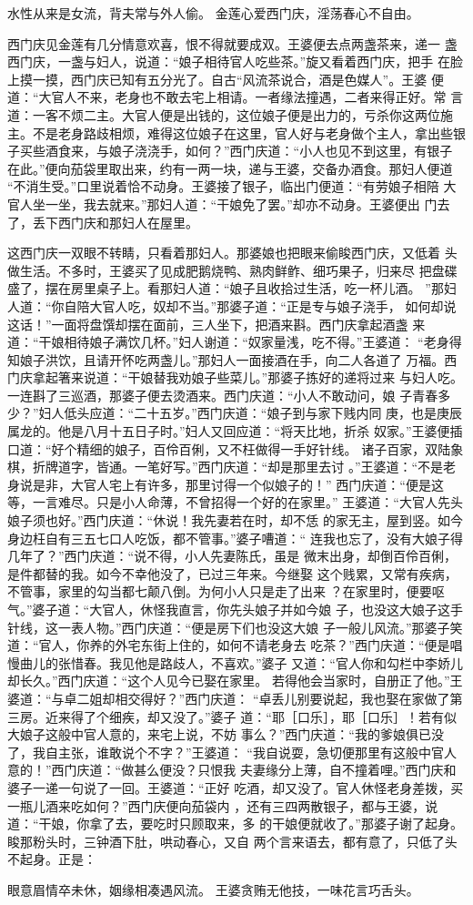 水性从来是女流，背夫常与外人偷。
金莲心爱西门庆，淫荡春心不自由。

西门庆见金莲有几分情意欢喜，恨不得就要成双。王婆便去点两盏茶来，递一
盏西门庆，一盏与妇人，说道：“娘子相待官人吃些茶。”旋又看着西门庆，把手
在脸上摸一摸，西门庆已知有五分光了。自古“风流茶说合，酒是色媒人”。王婆
便道：“大官人不来，老身也不敢去宅上相请。一者缘法撞遇，二者来得正好。常
言道：一客不烦二主。大官人便是出钱的，这位娘子便是出力的，亏杀你这两位施
主。不是老身路歧相烦，难得这位娘子在这里，官人好与老身做个主人，拿出些银
子买些酒食来，与娘子浇浇手，如何？”西门庆道：“小人也见不到这里，有银子
在此。”便向茄袋里取出来，约有一两一块，递与王婆，交备办酒食。那妇人便道
“不消生受。”口里说着恰不动身。王婆接了银子，临出门便道：“有劳娘子相陪
大官人坐一坐，我去就来。”那妇人道：“干娘免了罢。”却亦不动身。王婆便出
门去了，丢下西门庆和那妇人在屋里。

这西门庆一双眼不转睛，只看着那妇人。那婆娘也把眼来偷睃西门庆，又低着
头做生活。不多时，王婆买了见成肥鹅烧鸭、熟肉鲜鲊、细巧果子，归来尽
把盘碟盛了，摆在房里桌子上。看那妇人道：“娘子且收拾过生活，吃一杯儿酒。
”那妇人道：“你自陪大官人吃，奴却不当。”那婆子道：“正是专与娘子浇手，
如何却说这话！”一面将盘馔却摆在面前，三人坐下，把酒来斟。西门庆拿起酒盏
来道：“干娘相待娘子满饮几杯。”妇人谢道：“奴家量浅，吃不得。”王婆道：
“老身得知娘子洪饮，且请开怀吃两盏儿。”那妇人一面接酒在手，向二人各道了
万福。西门庆拿起箸来说道：“干娘替我劝娘子些菜儿。”那婆子拣好的递将过来
与妇人吃。一连斟了三巡酒，那婆子便去烫酒来。西门庆道：“小人不敢动问，娘
子青春多少？”妇人低头应道：“二十五岁。”西门庆道：“娘子到与家下贱内同
庚，也是庚辰属龙的。他是八月十五日子时。”妇人又回应道：“将天比地，折杀
奴家。”王婆便插口道：“好个精细的娘子，百伶百俐，又不枉做得一手好针线。
诸子百家，双陆象棋，折牌道字，皆通。一笔好写。”西门庆道：“却是那里去讨
。”王婆道：“不是老身说是非，大官人宅上有许多，那里讨得一个似娘子的！”
西门庆道：“便是这等，一言难尽。只是小人命薄，不曾招得一个好的在家里。”
王婆道：“大官人先头娘子须也好。”西门庆道：“休说！我先妻若在时，却不恁
的家无主，屋到竖。如今身边枉自有三五七口人吃饭，都不管事。”婆子嘈道：“
连我也忘了，没有大娘子得几年了？”西门庆道：“说不得，小人先妻陈氏，虽是
微末出身，却倒百伶百俐，是件都替的我。如今不幸他没了，已过三年来。今继娶
这个贱累，又常有疾病，不管事，家里的勾当都七颠八倒。为何小人只是走了出来
？在家里时，便要呕气。”婆子道：“大官人，休怪我直言，你先头娘子并如今娘
子，也没这大娘子这手针线，这一表人物。”西门庆道：“便是房下们也没这大娘
子一般儿风流。”那婆子笑道：“官人，你养的外宅东街上住的，如何不请老身去
吃茶？”西门庆道：“便是唱慢曲儿的张惜春。我见他是路歧人，不喜欢。”婆子
又道：“官人你和勾栏中李娇儿却长久。”西门庆道：“这个人见今已娶在家里。
若得他会当家时，自册正了他。”王婆道：“与卓二姐却相交得好？”西门庆道：
“卓丢儿别要说起，我也娶在家做了第三房。近来得了个细疾，却又没了。”婆子
道：“耶［口乐］，耶［口乐］！若有似大娘子这般中官人意的，来宅上说，不妨
事么？”西门庆道：“我的爹娘俱已没了，我自主张，谁敢说个不字？”王婆道：
“我自说耍，急切便那里有这般中官人意的！”西门庆道：“做甚么便没？只恨我
夫妻缘分上薄，自不撞着哩。”西门庆和婆子一递一句说了一回。王婆道：“正好
吃酒，却又没了。官人休怪老身差拨，买一瓶儿酒来吃如何？”西门庆便向茄袋内
，还有三四两散银子，都与王婆，说道：“干娘，你拿了去，要吃时只顾取来，多
的干娘便就收了。”那婆子谢了起身。睃那粉头时，三钟酒下肚，哄动春心，又自
两个言来语去，都有意了，只低了头不起身。正是：

眼意眉情卒未休，姻缘相凑遇风流。
王婆贪贿无他技，一味花言巧舌头。